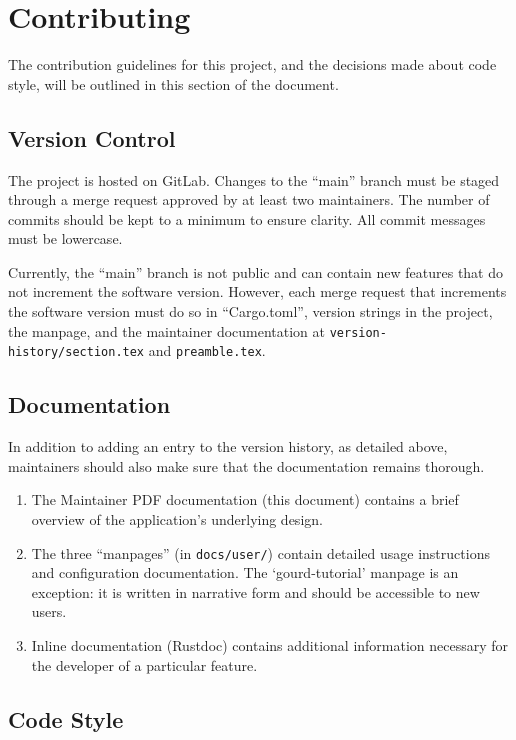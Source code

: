 \pagebreak


\section{Contributing}

The contribution guidelines for this project, and the decisions made about code style,
will be outlined in this section of the document.

\subsection{Version Control}

The project is hosted on GitLab.
Changes to the ``main'' branch must be staged through a merge request approved by at least two maintainers.
The number of commits should be kept to a minimum to ensure clarity.
All commit messages must be lowercase.

Currently, the ``main'' branch is not public and can contain new features that do not increment the software version.
However, each merge request that increments the software version must do so in ``Cargo.toml'', version strings in the project,
the manpage, and the maintainer documentation at \texttt{version-history/section.tex} and \texttt{preamble.tex}.

\subsection{Documentation}

In addition to adding an entry to the version history, as detailed above, maintainers should also make sure that the
documentation remains thorough.
\begin{enumerate}
  \item The Maintainer PDF documentation (this document) contains a brief overview of the application's underlying design.
  \item The three ``manpages'' (in \verb|docs/user/|) contain detailed usage instructions and configuration documentation.
        The `gourd-tutorial' manpage is an exception: it is written in narrative form and should be accessible to new users.
  \item Inline documentation (Rustdoc) contains additional information necessary for the developer of a particular feature.
\end{enumerate}

\subsection{Code Style}

